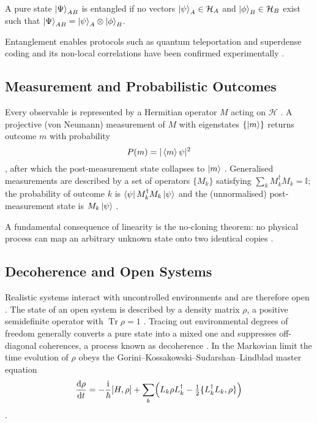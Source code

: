 \begin{definition}
A pure state $\ket{\Psi}_{AB}$ is entangled if no vectors $\ket{\psi}_A\in\mathcal H_A$ and $\ket{\phi}_B\in\mathcal H_B$ exist such that $\ket{\Psi}_{AB}=\ket{\psi}_A\otimes\ket{\phi}_B$.
\end{definition}

Entanglement enables protocols such as quantum teleportation and superdense coding \cite{Bennett1993,NielsenChuang2010} and its non-local correlations have been confirmed experimentally \cite{Aspect1982}.  

\subsection{Measurement and Probabilistic Outcomes}

Every observable is represented by a Hermitian operator $M$ acting on $\mathcal H$ \cite{vonNeumann1955}.  
A projective (von Neumann) measurement of $M$ with eigenstates $\{\ket{m}\}$ returns outcome $m$ with probability 
\begin{equation}
  P(m)=|\braket{m}{\psi}|^{2}
\end{equation} \cite{Born1926},
after which the post‐measurement state collapses to $\ket{m}$ \cite{vonNeumann1955}.  
Generalised measurements are described by a set of operators $\{M_k\}$ satisfying $\sum_k M_k^{\dagger}M_k=\mathbb I$; the probability of outcome $k$ is $\bra{\psi}M_k^{\dagger}M_k\ket{\psi}$ and the (unnormalised) post‐measurement state is $M_k\ket{\psi}$ \cite{NielsenChuang2010}.  

A fundamental consequence of linearity is the no‐cloning theorem: no physical process can map an arbitrary unknown state onto two identical copies \cite{Wootters1982,Dieks1982}.  

\subsection{Decoherence and Open Systems}

Realistic systems interact with uncontrolled environments and are therefore open \cite{Breuer2002}.  
The state of an open system is described by a density matrix $\rho$, a positive semidefinite operator with $\operatorname{Tr}\rho=1$ \cite{NielsenChuang2010}.  
Tracing out environmental degrees of freedom generally converts a pure state into a mixed one and suppresses off-diagonal coherences, a process known as decoherence \cite{Zurek2003,Schlosshauer2005}.  
In the Markovian limit the time evolution of $\rho$ obeys the Gorini–Kossakowski–Sudarshan–Lindblad master equation  
\begin{equation}
  \frac{\mathrm d\rho}{\mathrm dt}=-\frac{\mathrm i}{\hbar}[H,\rho]
  +\sum_k\Bigl(L_k\rho L_k^{\dagger}-\tfrac12\{L_k^{\dagger}L_k,\rho\}\Bigr)
\end{equation} \cite{Gorini1976,Lindblad1976}.

